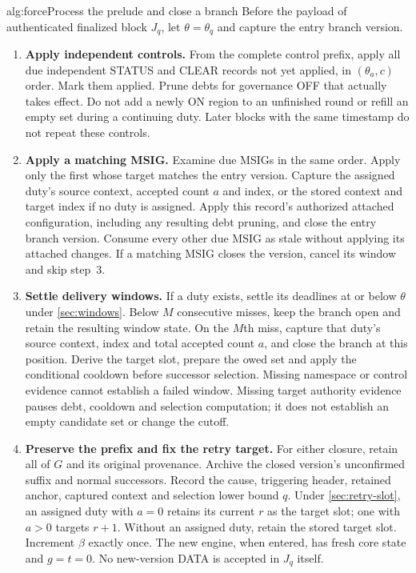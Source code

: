 \begin{protocol}{alg:force}{Process the prelude and close a branch}
Before the payload of authenticated finalized block $J_q$, let
$\theta=\theta_q$ and capture the entry branch version.
\begin{enumerate}[label=\textbf{\arabic*)},itemsep=3pt]
\item \textbf{Apply independent controls.} From the complete control
prefix, apply all due independent STATUS and CLEAR records not yet
applied, in $(\theta_a,c)$ order. Mark them applied. Prune debts for
governance OFF that actually takes effect. Do not add a newly ON
region to an unfinished round or refill an empty set during a
continuing duty. Later blocks with the same timestamp do not repeat
these controls.

\item \textbf{Apply a matching MSIG.} Examine due MSIGs in the same
order. Apply only the first whose target matches the entry version.
Capture the assigned duty's source context, accepted count $a$ and
index, or the stored context and target index if no duty is assigned.
Apply this record's authorized attached configuration, including any
resulting debt pruning, and close the entry branch version. Consume
every other due MSIG as stale without applying its attached changes.
If a matching MSIG closes the version, cancel its window and skip
step~3.

\item \textbf{Settle delivery windows.} If a duty exists, settle its
deadlines at or below $\theta$ under \cref{sec:windows}. Below $M$
consecutive misses, keep the branch open and retain the resulting
window state. On the $M$th miss, capture that duty's source context,
index and total accepted count $a$, and close the branch at this
position. Derive the target slot, prepare the owed set and apply the
conditional cooldown before successor selection. Missing namespace or
control evidence cannot establish a failed window. Missing target
authority evidence pauses debt, cooldown and selection computation;
it does not establish an empty candidate set or change the cutoff.

\item \textbf{Preserve the prefix and fix the retry target.} For
either closure, retain all of $G$ and its original provenance. Archive
the closed version's unconfirmed suffix and normal successors. Record
the cause, triggering header, retained anchor, captured context and
selection lower bound $q$. Under \cref{sec:retry-slot}, an assigned
duty with $a=0$ retains its current $r$ as the target slot; one with
$a>0$ targets $r+1$. Without an assigned duty, retain the stored
target slot. Increment $\beta$ exactly once. The new engine, when
entered, has fresh core state and $g=t=0$. No new-version DATA is
accepted in $J_q$ itself.


\end{enumerate}
\end{protocol}
